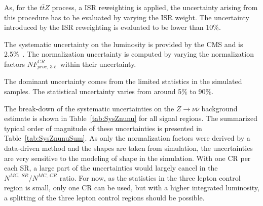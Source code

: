 As, for the $t\bar{t}Z$ process, a ISR reweighting is applied, the uncertainty arising from this procedure has to be evaluated by varying the ISR weight. The uncertainty introduced by the ISR reweighting is evaluated to be lower than 10\%. 

The systematic uncertainty on the luminosity is provided by the CMS and is  2.5\%~\cite{CMS-PAS-LUM-17-001}. The normalization uncertainty is computed by varying the normalization factors $NF_{proc,~3\ell}^{CR}$ within their uncertainty.

The dominant uncertainty comes from the limited statistics in the simulated samples. The statistical uncertainty varies from around 5\% to 90\%.

The break-down of the systematic uncertainties on the $Z \to \nu \bar{\nu}$  background estimate is shown in Table~\ref{tab:SysZnunu} for all signal regions. The summarized typical order of magnitude of these uncertainties is presented in Table~\ref{tab:SysZnunuSum}. As only the normalization factors were derived by a data-driven method and the shapes are taken from simulation, the uncertainties are very sensitive to the modeling of shape in the simulation. With one CR per each SR, a large part of the uncertainties would largely cancel in the $N^{MC,~SR}/ N^{MC,~CR}$ ratio. For now, as the statistics in the three lepton control region is small, only one CR can be used, but with a higher integrated luminosity, a splitting of the three lepton control regions should be possible.


